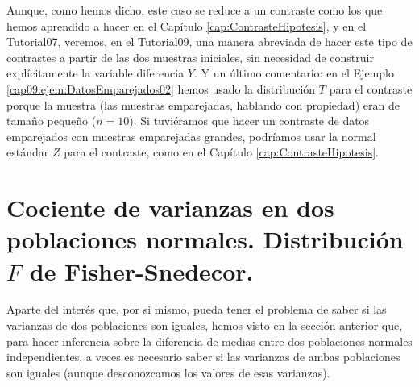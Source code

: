 Aunque, como hemos dicho, este caso se reduce a un contraste como los que hemos aprendido a hacer en el Capítulo \ref{cap:ContrasteHipotesis}, y en el Tutorial07, veremos,  en el Tutorial09, una manera abreviada de hacer este tipo de contrastes a partir de las dos muestras iniciales, sin necesidad de construir explícitamente la variable diferencia $Y$. Y un último comentario: en el Ejemplo \ref{cap09:ejem:DatosEmparejados02} hemos usado la distribución $T$ para el contraste porque la muestra (las muestras emparejadas, hablando con propiedad) eran de tamaño pequeño ($n=10$). Si tuviéramos que hacer un contraste de datos emparejados con muestras emparejadas grandes, podríamos usar la normal estándar $Z$ para el contraste, como en el Capítulo \ref{cap:ContrasteHipotesis}.

\section{Cociente de varianzas en dos poblaciones normales. Distribución $F$ de Fisher-Snedecor.}
\label{cap09:sec:CocienteVarianzas2PoblacionesDistribucionF}

Aparte del interés que, por si mismo, pueda tener el problema de saber si las varianzas de dos poblaciones son iguales, hemos visto en la sección anterior que, para hacer inferencia sobre la diferencia de medias entre dos poblaciones normales independientes, a veces es necesario saber si las varianzas de ambas poblaciones son iguales (aunque desconozcamos los valores de esas varianzas).

